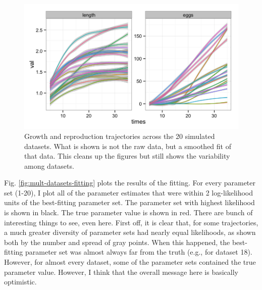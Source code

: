 \documentclass[12pt,reqno,final,pdftex]{amsart}\usepackage[]{graphicx}\usepackage[]{color}
\newenvironment{knitrout}{}{} %
\theoremstyle{plain}
\numberwithin{equation}{part}
\begin{document}
\begin{knitrout}\scriptsize
{}\color{fgcolor}\begin{figure}

\includegraphics[width=\linewidth]{figure/sim-datasets-1} \hfill{}

\caption[Growth and reproduction trajectories across the 20 simulated datasets]{Growth and reproduction trajectories across the 20 simulated datasets. What is shown is not the raw data, but a smoothed fit of that data. This cleans up the figures but still shows the variability among datasets.}\label{fig:sim-datasets}
\end{figure}


\end{knitrout}

Fig. \ref{fig:mult-datasets-fitting} plots the results of the fitting.
For every parameter set (1-20), I plot all of the parameter estimates that were within 2 log-likelihood units of the best-fitting parameter set.
The parameter set with highest likelihood is shown in black.
The true parameter value is shown in red.
There are bunch of interesting things to see, even here.
First off, it is clear that, for some trajectories, a much greater diversity of parameter sets had nearly equal likelihoods, as shown both by the number and spread of gray points.
When this happened, the best-fitting parameter set was almost always far from the truth (e.g., for dataset 18).
However, for almost every dataset, some of the parameter sets contained the true parameter value.
However, I think that the overall message here is basically optimistic.
\end{document}
